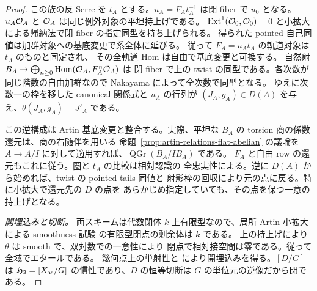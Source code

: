 \begin{proof}
この族の反 Serre を $t_A$ とする。$u_A=F_A t_A^{-1}$ は閉 fiber で
$u_0$ となる。$u_A\mathcal O_A$ と $\mathcal O_A$ は同じ例外対象の平坦持上げである。
$\operatorname{Ext}^1(\mathcal O_0,\mathcal O_0)=0$ と小拡大による帰納法で閉 fiber の指定同型を持ち上げられる。
得られた pointed 自己同値は加群対象への基底変更で系全体に延びる。
従って $F_A=u_A t_A$ の軌道対象は $t_A$ のものと同定され、
その全軌道 Hom は自由で基底変更と可換する。
自然射 $B_A\to\bigoplus_{n\ge0}\operatorname{Hom}(\mathcal O_A,F_A^n\mathcal O_A)$ は
閉 fiber で上の twist の同型である。各次数が同じ階数の自由加群なので
Nakayama によって全次数で同型となる。
ゆえに次数一の枠を移した canonical 関係式と $u_A$ の行列が
$(J_A,g_A)\in D(A)$ を与え、$\theta(J_A,g_A)=J'_A$ である。

この逆構成は Artin 基底変更と整合する。実際、平坦な $B_A$ の
torsion 商の係数還元は、商の右随伴を用いる
命題~\ref{prop:artin-relations-flat-abelian} の議論を
$A\to A/I$ に対して適用すれば、$\operatorname{QGr}(B_A/IB_A)$ である。
$F_A$ と自由 row の還元もこれに従う。圏と $t_A$ の比較は相対認識の
全忠実性による。逆に $D(A)$ から始めれば、twist の pointed tails 同値と
射影枠の回収により元の点に戻る。特に小拡大で還元先の $D$ の点を
あらかじめ指定していても、その点を保つ一意の持上げとなる。

\emph{開埋込みと切断。}
両スキームは代数閉体 $k$ 上有限型なので、局所 Artin 小拡大による
smoothness 試験 \cite[Tag 02HY]{StacksSmoothAtlas} の有限型閉点の剰余体は $k$ である。
上の持上げにより $\theta$ は smooth で、双対数での一意性により
閉点で相対接空間は零である。従って全域でエタールである。
幾何点上の単射性と \cite[Tag 025G]{StacksBoundaryComparison}
により開埋込みを得る。$[D/G]$ は $\mathfrak H_2=[X_{\mathrm{as}}/G]$
の慣性であり、$D$ の恒等切断は $G$ の単位元の逆像だから閉である。
\end{proof}


